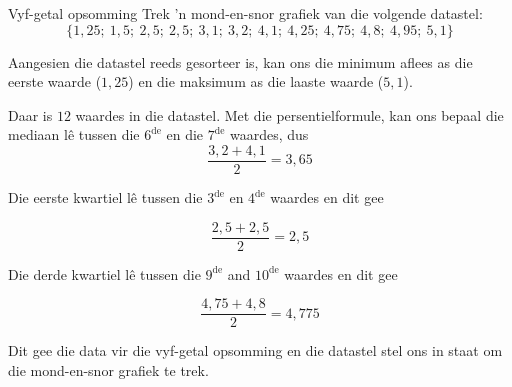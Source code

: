 \begin{wex}{Vyf-getal opsomming}
{Trek ’n mond-en-snor grafiek van die volgende datastel:
    \begin{equation*}
      \{1,25;\ 1,5;\ 2,5;\ 2,5;\ 3,1;\ 3,2;\ 4,1;\ 4,25;\ 4,75;\ 4,8;\ 4,95;\ 5,1\}
    \end{equation*}
}{

  Aangesien die datastel reeds gesorteer is, kan ons die minimum aflees as die eerste waarde ($1,25$) en die maksimum as die laaste waarde ($5,1$).


  Daar is $12$ waardes in die datastel. Met die persentielformule, kan ons bepaal die mediaan lê tussen die $6^{\mathrm{de}}$ en die $7^{\mathrm{de}}$
  waardes, dus
  \begin{equation*}
    \frac{3,2 + 4,1}{2} = 3,65
  \end{equation*}

  Die eerste kwartiel lê tussen die $3^{\mathrm{de}}$ en $4^{\mathrm{de}}$ waardes en dit gee
  
  \begin{equation*}
    \frac{2,5 + 2,5}{2} = 2,5
  \end{equation*}

  Die derde kwartiel lê tussen die $9^{\mathrm{de}}$ and $10^{\mathrm{de}}$ waardes en dit gee
  
  \begin{equation*}
    \frac{4,75 + 4,8}{2} = 4,775
  \end{equation*}

 Dit gee die data vir die vyf-getal opsomming en die datastel stel ons in staat om die mond-en-snor grafiek te trek.

  \begin{center}
\end{center}}
\end{wex}
